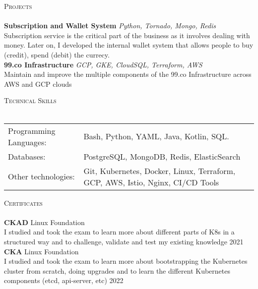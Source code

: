 \documentclass[a4paper]{article}
\newcommand{\lineunder} {
    \vspace*{-8pt} \\
    \hspace*{-18pt} \hrulefill \\
}
\newcommand{\header} [1] {
    {\hspace*{-18pt}\vspace*{6pt} \textsc{#1}}
    \vspace*{-6pt} \lineunder
}
\begin{document}
\header{Projects}
{\textbf{Subscription and Wallet System}} {\sl Python, Tornado, Mongo, Redis} \\
Subscription service is the critical part of the business as it involves dealing with money. Later on, I developed the internal wallet system that allows people to buy (credit), spend (debit) the currecy.\\
\vspace*{2mm}
{\textbf{99.co Infrastructure}} {\sl GCP, GKE, CloudSQL, Terraform, AWS} \\
Maintain and improve the multiple components of the 99.co Infrastructure across AWS and GCP clouds\\
\vspace*{2mm}

\header{Technical Skills}
\begin{tabular}{ l l }
	Programming Languages: & Bash, Python, YAML, Java, Kotlin, SQL.                                         \\
	Databases:             & PostgreSQL, MongoDB, Redis, ElasticSearch                                      \\
	Other technologies:    & Git, Kubernetes, Docker, Linux, Terraform, GCP, AWS, Istio, Nginx, CI/CD Tools \\
\end{tabular}
\vspace{2mm}

\header{Certificates}
\textbf{CKAD} \hfill Linux Foundation\\
I studied and took the exam to learn more about different parts of K8s in a structured way and to challenge, validate and test my existing knowledge \hfill 2021\\
\vspace*{2mm}
\textbf{CKA} \hfill Linux Foundation\\
I studied and took the exam to learn more about bootstrapping the Kubernetes cluster from scratch, doing upgrades and to learn the different Kubernetes components (etcd, api-server, etc) \hfill 2022\\
\vspace*{2mm}

\ 
\end{document}
